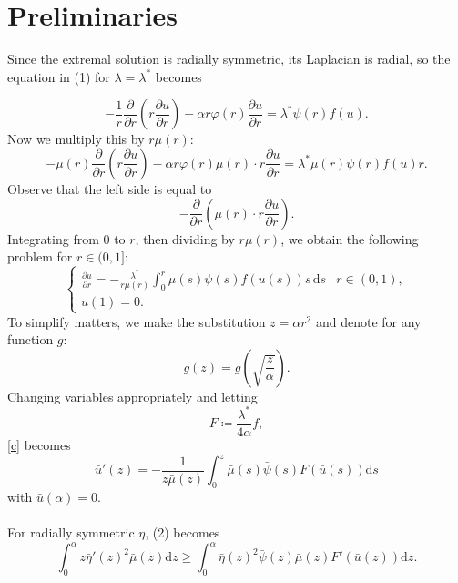 \documentclass{article}
\begin{document}
\section{Preliminaries}
Since the extremal solution is radially symmetric, its Laplacian is radial, so the equation in (1) for $\lambda=\lambda^*$ becomes

    \[
        -\frac 1r\frac{\partial}{\partial r}\left(r\frac{\partial u}{\partial r}\right) - \alpha r\varphi(r)\frac{\partial u}{\partial r} = \lambda^*\psi(r)f(u).
    \]
    Now we multiply this by $r\mu(r)$:
    \[
        -\mu(r)\frac{\partial}{\partial r}\left(r\frac{\partial u}{\partial r}\right) - \alpha r\varphi(r)\mu(r)\cdot r\frac{\partial u}{\partial r} = \lambda^*\mu(r)\psi(r)f(u)r.
    \]
    Observe that the left side is equal to
    \[
        -\frac{\partial}{\partial r}\left(\mu(r)\cdot r\frac{\partial u}{\partial r}\right).
    \]
    Integrating from 0 to $r$, then dividing by $r\mu(r)$, we obtain the following problem for $r\in(0,1]$:
    \begin{equation}\label{c}
        \begin{cases}\frac{\partial u}{\partial r} = -\frac {\lambda^*}{r\mu(r)}\int_0^r\mu(s)\psi(s)f(u(s))s\,\mathrm{d}s & r\in (0,1), \\
        u(1) = 0.\end{cases}
    \end{equation}
    To simplify matters, we make the substitution $z = \alpha r^2$ and denote for any function $g$:
    \[\bar g(z) = g\left(\sqrt{\frac z\alpha}\right).\]
    Changing variables appropriately and letting 
    \begin{equation}\label{epsilon}
        F \coloneqq \frac{\lambda^*}{4\alpha} f,
    \end{equation} \eqref{c} becomes
    \begin{equation}\label{d}
        \bar u'(z) = -\frac{1}{z\bar\mu(z)}\int_0^z\bar\mu(s)\bar\psi(s)F(\bar u(s))\mathrm{d}s
    \end{equation}
    with $\bar u(\alpha) = 0$. \\ \\ For radially symmetric $\eta$, (2) becomes
    \begin{equation}
        \int_0^\alpha z\bar\eta'(z)^2\bar\mu(z)\mathrm{d}z\geq \int_0^\alpha\bar\eta(z)^2\bar\psi(z)\bar\mu(z)F'(\bar u(z))\mathrm{d}z.
    \end{equation}
\end{document}
